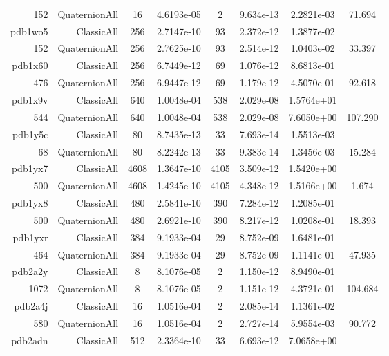 \begin{xltabular}{\textwidth}{r|rcS[table-format=1.4e+2]cS[table-format=1.3e+2]S[table-format=1.4e+2]S[table-format=-1.3]}
152 & QuaternionAll & 16 & 4.6193e-05 & 2 & 9.634e-13 & 2.2821e-03 & 71.694\\  \addlinespace
pdb1wo5 & ClassicAll & 256 & 2.7147e-10 & 93 & 2.372e-12 & 1.3877e-02 & \\
152 & QuaternionAll & 256 & 2.7625e-10 & 93 & 2.514e-12 & 1.0403e-02 & 33.397\\  \addlinespace
pdb1x60 & ClassicAll & 256 & 6.7449e-12 & 69 & 1.076e-12 & 8.6813e-01 & \\
476 & QuaternionAll & 256 & 6.9447e-12 & 69 & 1.179e-12 & 4.5070e-01 & 92.618\\  \addlinespace
pdb1x9v & ClassicAll & 640 & 1.0048e-04 & 538 & 2.029e-08 & 1.5764e+01 & \\
544 & QuaternionAll & 640 & 1.0048e-04 & 538 & 2.029e-08 & 7.6050e+00 & 107.290\\  \addlinespace
pdb1y5c & ClassicAll & 80 & 8.7435e-13 & 33 & 7.693e-14 & 1.5513e-03 & \\
68 & QuaternionAll & 80 & 8.2242e-13 & 33 & 9.383e-14 & 1.3456e-03 & 15.284\\  \addlinespace
pdb1yx7 & ClassicAll & 4608 & 1.3647e-10 & 4105 & 3.509e-12 & 1.5420e+00 & \\
500 & QuaternionAll & 4608 & 1.4245e-10 & 4105 & 4.348e-12 & 1.5166e+00 & 1.674\\  \addlinespace
pdb1yx8 & ClassicAll & 480 & 2.5841e-10 & 390 & 7.284e-12 & 1.2085e-01 & \\
500 & QuaternionAll & 480 & 2.6921e-10 & 390 & 8.217e-12 & 1.0208e-01 & 18.393\\  \addlinespace
pdb1yxr & ClassicAll & 384 & 9.1933e-04 & 29 & 8.752e-09 & 1.6481e-01 & \\
464 & QuaternionAll & 384 & 9.1933e-04 & 29 & 8.752e-09 & 1.1141e-01 & 47.935\\  \addlinespace
pdb2a2y & ClassicAll & 8 & 8.1076e-05 & 2 & 1.150e-12 & 8.9490e-01 & \\
1072 & QuaternionAll & 8 & 8.1076e-05 & 2 & 1.151e-12 & 4.3721e-01 & 104.684\\  \addlinespace
pdb2a4j & ClassicAll & 16 & 1.0516e-04 & 2 & 2.085e-14 & 1.1361e-02 & \\
580 & QuaternionAll & 16 & 1.0516e-04 & 2 & 2.727e-14 & 5.9554e-03 & 90.772\\  \addlinespace
pdb2adn & ClassicAll & 512 & 2.3364e-10 & 33 & 6.693e-12 & 7.0658e+00 & \\

\end{xltabular}
